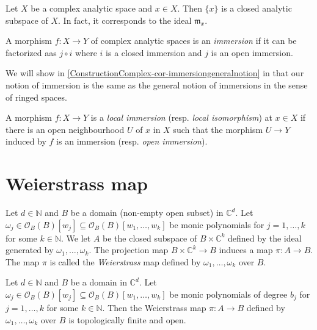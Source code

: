 \begin{example}\label{ex-closedpointanalytic}
    Let $X$ be a complex analytic space and $x\in X$. Then $\{x\}$ is a closed analytic subspace of $X$. In fact, it corresponds to the ideal $\mathfrak{m}_x$.
\end{example}

\begin{definition}
    A morphism $f:X\rightarrow Y$ of complex analytic spaces is an \emph{immersion} if it can be factorized aas $j\circ i$ where $i$ is a closed immersion and $j$ is an open immersion. 
\end{definition}
We will show in \cref{ConstructionComplex-cor-immersiongeneralnotion} in  that our notion of immersion is the same as the general notion of immersions in the sense of ringed spaces.

\begin{definition}
    A morphism $f:X\rightarrow Y$ is a \emph{local immersion} (resp. \emph{local isomorphism}) at $x\in X$ if  there is an open neighbourhood $U$ of $x$ in $X$ such that the morphism $U\rightarrow Y$ induced by $f$ is an immersion (resp. \emph{open immersion}).
\end{definition}

\section{Weierstrass map}

\begin{definition}
    Let $d\in \mathbb{N}$ and $B$ be a domain (non-empty open subset) in $\mathbb{C}^d$. Let $\omega_j \in \mathcal{O}_B(B)[w_j]\subseteq \mathcal{O}_B(B)[w_1,\ldots,w_k]$ be monic polynomials for $j=1,\ldots,k$ for some $k\in \mathbb{N}$. We let $A$ be the closed subspace of $B\times \mathbb{C}^k$ defined by the ideal generated by $\omega_1,\ldots,\omega_k$. The projection map $B\times \mathbb{C}^k\rightarrow B$ induces a map $\pi:A\rightarrow B$. The map $\pi$ is called the \emph{Weierstrass} map defined by $\omega_1,\ldots,\omega_k$ over $B$.
\end{definition}


\begin{thm}\label{thm-Weiemapfiniteandopen}
    Let $d\in \mathbb{N}$ and $B$ be a domain in $\mathbb{C}^d$. Let $\omega_j \in \mathcal{O}_B(B)[w_j]\subseteq \mathcal{O}_B(B)[w_1,\ldots,w_k]$ be monic polynomials of degree $b_j$ for $j=1,\ldots,k$ for some $k\in \mathbb{N}$. Then the Weierstrass map $\pi:A\rightarrow B$ defined by $\omega_1,\ldots,\omega_k$ over $B$ is topologically finite and open.
\end{thm}


